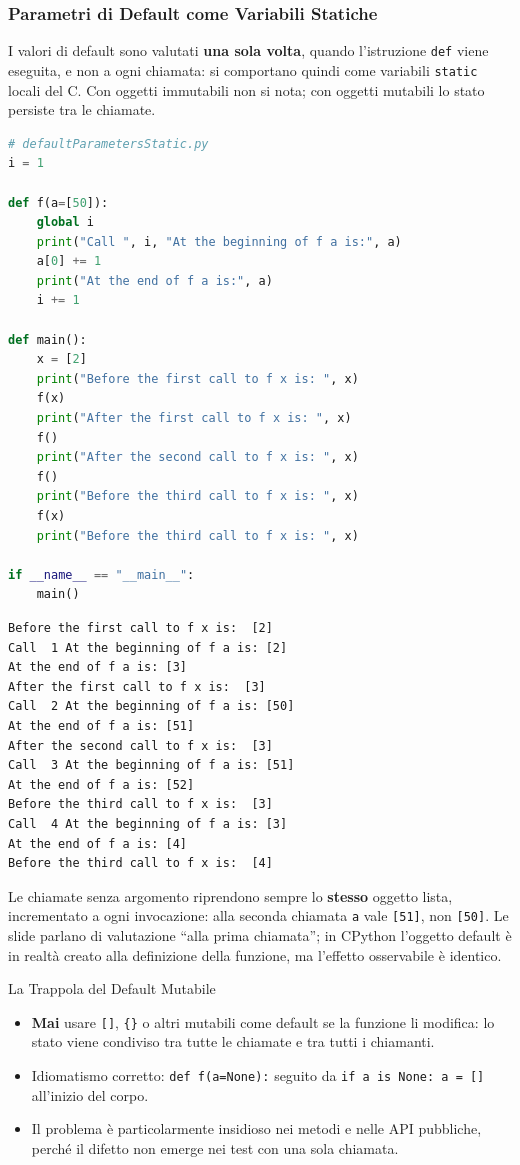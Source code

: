 \documentclass[12pt]{extarticle}
\begin{document}
\subsubsection{Parametri di Default come Variabili Statiche}

\noindent I valori di default sono valutati \textbf{una sola volta}, quando l'istruzione \texttt{def} viene eseguita, e non a ogni chiamata: si comportano quindi come variabili \texttt{static} locali del C. Con oggetti immutabili non si nota; con oggetti mutabili lo stato persiste tra le chiamate.

\begin{lstlisting}[language=Python]
# defaultParametersStatic.py
i = 1

def f(a=[50]):
    global i
    print("Call ", i, "At the beginning of f a is:", a)
    a[0] += 1
    print("At the end of f a is:", a)
    i += 1

def main():
    x = [2]
    print("Before the first call to f x is: ", x)
    f(x)
    print("After the first call to f x is: ", x)
    f()
    print("After the second call to f x is: ", x)
    f()
    print("Before the third call to f x is: ", x)
    f(x)
    print("Before the third call to f x is: ", x)

if __name__ == "__main__":
    main()
\end{lstlisting}

\begin{lstlisting}[numbers=none]
Before the first call to f x is:  [2]
Call  1 At the beginning of f a is: [2]
At the end of f a is: [3]
After the first call to f x is:  [3]
Call  2 At the beginning of f a is: [50]
At the end of f a is: [51]
After the second call to f x is:  [3]
Call  3 At the beginning of f a is: [51]
At the end of f a is: [52]
Before the third call to f x is:  [3]
Call  4 At the beginning of f a is: [3]
At the end of f a is: [4]
Before the third call to f x is:  [4]
\end{lstlisting}

\noindent Le chiamate senza argomento riprendono sempre lo \textbf{stesso} oggetto lista, incrementato a ogni invocazione: alla seconda chiamata \texttt{a} vale \texttt{[51]}, non \texttt{[50]}. Le slide parlano di valutazione ``alla prima chiamata''; in CPython l'oggetto default è in realtà creato alla definizione della funzione, ma l'effetto osservabile è identico.

\begin{cbox}{La Trappola del Default Mutabile}
\begin{itemize}
    \item \textbf{Mai} usare \texttt{[]}, \texttt{\{\}} o altri mutabili come default se la funzione li modifica: lo stato viene condiviso tra tutte le chiamate e tra tutti i chiamanti.
    \item Idiomatismo corretto: \texttt{def f(a=None):} seguito da \texttt{if a is None: a = []} all'inizio del corpo.
    \item Il problema è particolarmente insidioso nei metodi e nelle API pubbliche, perché il difetto non emerge nei test con una sola chiamata.
\end{itemize}
\end{cbox}
\end{document}
